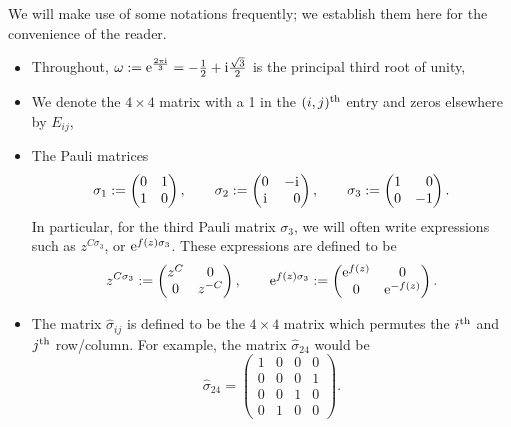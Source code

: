 \documentclass[10pt,a4paper]{amsart}
\numberwithin{equation}{section}
\begin{document}
We will make use of some notations frequently; we establish them here for the convenience of the reader.
 \begin{itemize}\itemsep=0pt
 \item Throughout, $\omega := {\rm e}^{\frac{2\pi {\rm i}}{3}} = -\frac{1}{2} + {\rm i}\frac{\sqrt{3}}{2}$ is the principal third root of unity,
 \item We denote the $4\times 4$ matrix with a 1 in the $(i,j)^{\rm th}$ entry and zeros elsewhere by $E_{ij}$,
 \item The Pauli matrices
 \begin{equation*}
 \sigma_{1} := \begin{pmatrix} 0 & 1\\ 1 & 0\end{pmatrix}, \qquad
 \sigma_{2} := \begin{pmatrix} 0 & -{\rm i}\\ {\rm i} & \hphantom{-} 0\end{pmatrix},\qquad
 \sigma_{3} := \begin{pmatrix} 1 & \hphantom{-} 0\\ 0 & -1 \end{pmatrix}.
 \end{equation*}
 In particular, for the third Pauli matrix $\sigma_3$, we will often write expressions such as $z^{C \sigma_3}$, or ${\rm e}^{f(z)\sigma_3}$. These expressions are defined to be
 \begin{equation*}
 z^{C \sigma_3} := \begin{pmatrix}
 z^{C} & 0\\
 0 & z^{-C}
 \end{pmatrix},\qquad
 {\rm e}^{f(z)\sigma_3} :=
 \begin{pmatrix}
 {\rm e}^{f(z)} & 0\\
 0 & {\rm e}^{-f(z)}
 \end{pmatrix}.
 \end{equation*}
 \item The matrix $\hat{\sigma}_{ij}$ is defined to be the $4\times 4$ matrix which permutes the $i^{\rm th}$ and $j^{\rm th}$ row/column. For example, the matrix $\hat{\sigma}_{24}$ would be
 \begin{equation*}
 \hat{\sigma}_{24} =
 \begin{pmatrix}
 1 & 0 & 0 & 0\\
 0 & 0 & 0 & 1\\
 0 & 0 & 1 & 0\\
 0 & 1 & 0 & 0
 \end{pmatrix}.

\end{equation*}
\end{itemize}
\end{document}
